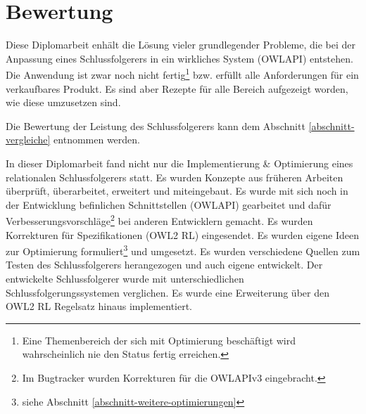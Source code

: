 \chapter{Bewertung}
Diese Diplomarbeit enhält die Lösung vieler grundlegender Probleme, die bei der Anpassung eines Schlussfolgerers in ein wirkliches System (OWLAPI) entstehen. Die Anwendung ist zwar noch nicht fertig\footnote{Eine Themenbereich der sich mit Optimierung beschäftigt wird wahrscheinlich nie den Status fertig erreichen.} bzw. erfüllt alle Anforderungen für ein verkaufbares Produkt. Es sind aber Rezepte für alle Bereich aufgezeigt worden, wie diese umzusetzen sind.

Die Bewertung der Leistung des Schlussfolgerers kann dem Abschnitt \ref{abschnitt-vergleiche} entnommen werden.

In dieser Diplomarbeit fand nicht nur die Implementierung \& Optimierung eines relationalen Schlussfolgerers statt. Es wurden Konzepte aus früheren Arbeiten überprüft, überarbeitet, erweitert und miteingebaut. Es wurde mit sich noch in der Entwicklung befinlichen Schnittstellen (OWLAPI) gearbeitet und dafür Verbesserungsvorschläge\footnote{Im Bugtracker wurden Korrekturen für die OWLAPIv3 eingebracht.} bei anderen Entwicklern gemacht. Es wurden Korrekturen für Spezifikationen (OWL2 RL) eingesendet. Es wurden eigene Ideen zur Optimierung formuliert\footnote{siehe Abschnitt \ref{abschnitt-weitere-optimierungen}} und umgesetzt. Es wurden verschiedene Quellen zum Testen des Schlussfolgerers herangezogen und auch eigene entwickelt. Der entwickelte Schlussfolgerer wurde mit unterschiedlichen Schlussfolgerungssystemen verglichen. Es wurde eine Erweiterung über den OWL2 RL Regelsatz hinaus implementiert.

